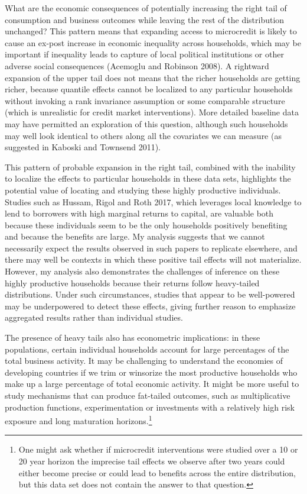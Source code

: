 \documentclass[AER]{AEA}
\begin{document}
What are the economic consequences of potentially increasing the right tail of consumption and business outcomes while leaving the rest of the distribution unchanged? This pattern means that expanding access to microcredit is likely to cause an ex-post increase in economic inequality across households, which may be important if inequality leads to capture of local political institutions or other adverse social consequences (Acemoglu and Robinson 2008). A rightward expansion of the upper tail does not means that the richer households are getting richer, because quantile effects cannot be localized to any particular households without invoking a rank invariance assumption or some comparable structure (which is unrealistic for credit market interventions). More detailed baseline data may have permitted an exploration of this question, although such households may well look identical to others along all the covariates we can measure (as suggested in Kaboski and Townsend 2011).

This pattern of probable expansion in the right tail, combined with the inability to localize the effects to particular households in these data sets, highlights the potential value of locating and studying these highly productive individuals. Studies such as Hussam, Rigol and Roth 2017, which leverages local knowledge to lend to borrowers with high marginal returns to capital, are valuable both because these individuals seem to be the only households positively benefiting and because the benefits are large. My analysis suggests that we cannot necessarily expect the results observed in such papers to replicate elsewhere, and there may well be contexts in which these positive tail effects will not materialize. However, my analysis also demonstrates the challenges of inference on these highly productive households because their returns follow heavy-tailed distributions. Under such circumstances, studies that appear to be well-powered may be underpowered to detect these effects, giving further reason to emphasize aggregated results rather than individual studies.



The presence of heavy tails also has econometric implications: in these populations, certain individual households account for large percentages of the total business activity. It may be challenging to understand the economies of developing countries if we trim or winsorize the most productive households who make up a large percentage of total economic activity. It might be more useful to study mechanisms that can produce fat-tailed outcomes, such as multiplicative production functions, experimentation or investments with a relatively high risk exposure and long maturation horizons.\footnote{One might ask whether if microcredit interventions were studied over a 10 or 20 year horizon the imprecise tail effects we observe after two years could either become precise or could lead to benefits across the entire distribution, but this data set does not contain the answer to that question.}
\end{document}
